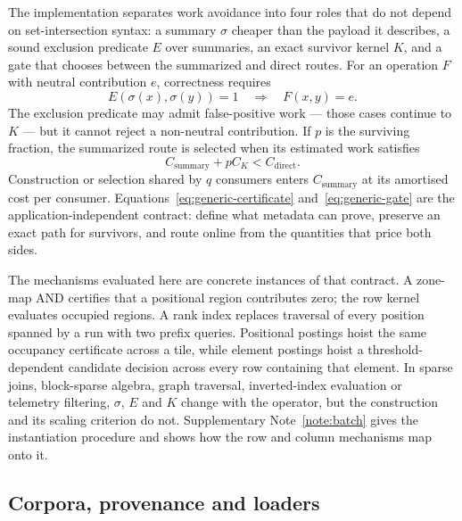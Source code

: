 The implementation separates work avoidance into four roles that do not depend on set-intersection
syntax: a summary $\sigma$ cheaper than the payload it describes, a sound exclusion predicate $E$
over summaries, an exact survivor kernel $K$, and a gate that chooses between the summarized and
direct routes. For an operation $F$ with neutral contribution $e$, correctness requires
\begin{equation}
E\!\left(\sigma(x),\sigma(y)\right)=1
\quad\Longrightarrow\quad F(x,y)=e .
\label{eq:generic-certificate}
\end{equation}
The exclusion predicate may admit false-positive work --- those cases continue to $K$ --- but it
cannot reject a non-neutral contribution. If $p$ is the surviving fraction, the summarized route is
selected when its estimated work satisfies
\begin{equation}
C_{\mathrm{summary}}+pC_{K}<C_{\mathrm{direct}} .
\label{eq:generic-gate}
\end{equation}
Construction or selection shared by $q$ consumers enters $C_{\mathrm{summary}}$ at its amortised cost
per consumer. Equations~\eqref{eq:generic-certificate} and~\eqref{eq:generic-gate} are the
application-independent contract: define what metadata can prove, preserve an exact path for
survivors, and route online from the quantities that price both sides.

The mechanisms evaluated here are concrete instances of that contract. A zone-map AND certifies that
a positional region contributes zero; the row kernel evaluates occupied regions. A rank index
replaces traversal of every position spanned by a run with two prefix queries. Positional postings
hoist the same occupancy certificate across a tile, while element postings hoist a threshold-dependent candidate decision
across every row containing that element. In sparse joins, block-sparse algebra, graph traversal,
inverted-index evaluation or telemetry filtering, $\sigma$, $E$ and $K$ change with the operator, but
the construction and its scaling criterion do not. Supplementary Note~\ref{note:batch} gives the
instantiation procedure and shows how the row and column mechanisms map onto it.



\subsection*{Corpora, provenance and loaders}

